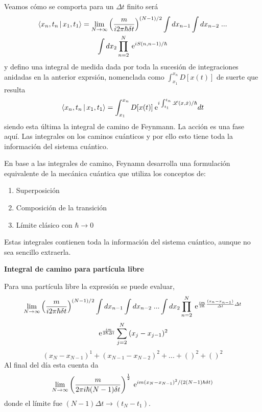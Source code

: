 \documentclass[10pt,oneside]{CBFT_book}
\begin{document}
Veamos cómo se comporta para un $\Delta t$ finito será 
\begin{multline*}
	\Braket{x_n,t_n|x_1,t_1}  = 
	\lim_{N\to\infty} \left(\frac{m}{i2\pi\hbar\delta t}\right)^{(N-1)/2}
	\int dx_{n-1}\int dx_{n-2} \; ... \\
	\int dx_2 \prod_{n=2}^N \:\mathrm{e}^{i S(n,n-1)/\hbar}
\end{multline*}
y defino una integral de medida dada por toda la sucesión de integraciones anidadas
en la anterior exprsión, nomenclada como $\int_{x_1}^{x_n} D[x(t)]$ de suerte que
resulta
\[
	\Braket{x_n,t_n|x_1,t_1}  = 
	\int_{x_1}^{x_n} D[x(t)] \:\mathrm{e}^{i \int _{t_1}^{t_n} \mathscr{L}(x,\dot{x})/\hbar} dt
\]
siendo esta última la integral de camino de Feynmann.
La acción es una fase aquí. Las integrales on los caminos cuánticos y por ello esto tiene
toda la información del sistema cuántico.

En base a las integrales de camino, Feynamn desarrolla una formulación equivalente de la 
mecánica cuántica que utiliza los conceptos de:
\begin{enumerate}
 \item Superposición
 \item Composición de la transición
 \item Límite clásico con $\hbar \to 0$
\end{enumerate}

Estas integrales contienen toda la información del sistema cuántico, aunque no sea sencillo extraerla.

\begin{ejemplo}{\bf Integral de camino para partícula libre}

Para una partícula libre la expresión se puede evaluar, 
\[
	\lim_{N\to\infty} \left(\frac{m}{i2\pi\hbar\delta t}\right)^{(N-1)/2}
	\int dx_{n-1}\int dx_{n-2} \; ... 
	\int dx_2 \prod_{n=2}^N \:\mathrm{e}^{ \frac{ i m}{2\hbar} \frac{(x_n - x_{n-1})}{\Delta t} \Delta t}
\]
\[
	\:\mathrm{e}^{ \frac{ i m }{2 \hbar \Delta t } } \sum_{j=2}^N \: ( x_j - x_{j-1} )^2
\]
\[
	( x_N - x_{N-1} )^1 + (x_{N-1} - x_{N-2})^2 + ... + ()^2 + ()^2
\]
Al final del día esta cuenta da
\[
	\lim_{N\to\infty} \left( \frac{ m }{2 \pi i \hbar (N-1) \delta t} \right)^{\frac{1}{2}}
	\:\mathrm{e}^{ i m (x_N - x_{N-1})^2 /( 2(N-1)\hbar \delta t )}
\]
donde el límite fue $(N-1)\Delta t \to (t_N -t_1)$.
 
\end{ejemplo}
\end{document}
